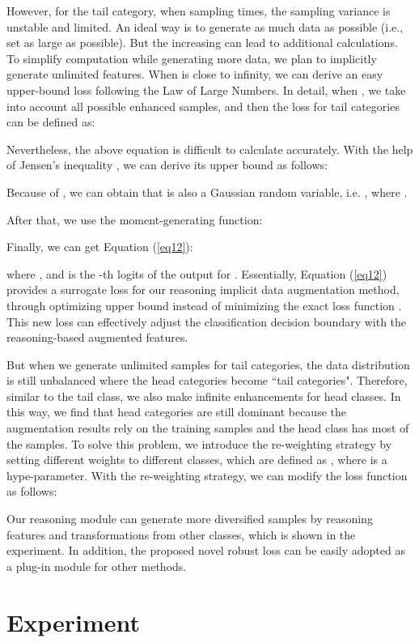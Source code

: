 \documentclass[letterpaper]{article} \usepackage{aaai22}  \usepackage{times}  \usepackage{helvet}  \usepackage{courier}  \usepackage[hyphens]{url}  \usepackage{graphicx} \usepackage{bm}
\begin{document}
	However, for the tail category, when sampling  times, the sampling variance is unstable and limited. An ideal way is to generate as much data as possible (i.e., set  as large as possible). But the increasing  can lead to additional calculations. To simplify computation while generating more data, we plan to implicitly generate unlimited features. When  is close to infinity, we can derive an easy upper-bound loss following the Law of Large Numbers.
	In detail, when , we take into account all possible enhanced samples, and then the loss for tail categories can be defined as:
	
	
	Nevertheless, the above equation is difficult to calculate accurately. With the help of Jensen’s inequality , we can derive its upper bound as follows: 
	
	Because of 
	, we can obtain that  is also a Gaussian random variable, i.e.
	, where .
	
	After that, we use the moment-generating function: 
	
	 
	Finally, we can get Equation (\ref{eq12}): 
	
	 
	where 
	, and  is the -th logits of the output for . Essentially, Equation (\ref{eq12}) provides a surrogate
	loss for our reasoning implicit data augmentation method, through optimizing upper bound 
	instead of minimizing the exact loss function . This new loss can effectively adjust the classification decision boundary with the reasoning-based augmented features. 
	
	But when we generate unlimited samples for tail categories, the data distribution is still unbalanced where the head categories become ``tail categories". Therefore, similar to the tail class, we also make infinite enhancements for head classes. In this way, we find that head categories are still dominant because the augmentation results rely on the training samples and the head class has most of the samples. To solve this problem, we introduce the re-weighting strategy by setting different weights to different classes, which are defined as , where  is a hype-parameter. With the re-weighting strategy, we can modify the loss function as follows: 
	 


	Our reasoning module can generate more diversified samples by reasoning features and transformations from other classes, which is shown in the experiment. In addition, the proposed novel robust loss can be easily adopted as a plug-in module for other methods.
	
	\section{Experiment}
	
\end{document}
